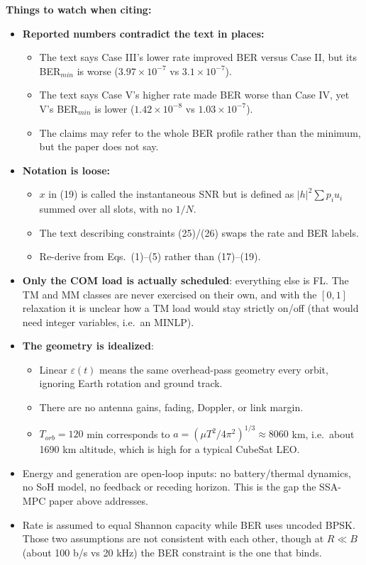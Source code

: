 \documentclass[11pt]{article}
\begin{document}
\textbf{Things to watch when citing:}
\begin{itemize}[noitemsep]
    \item \textbf{Reported numbers contradict the text in places:}
    \begin{itemize}[noitemsep]
        \item The text says Case III's lower rate improved BER versus Case II, but its BER$_{min}$ is worse ($3.97\times10^{-7}$ vs $3.1\times10^{-7}$).
        \item The text says Case V's higher rate made BER worse than Case IV, yet V's BER$_{min}$ is lower ($1.42\times10^{-8}$ vs $1.03\times10^{-7}$).
        \item The claims may refer to the whole BER profile rather than the minimum, but the paper does not say.
    \end{itemize}
    \item \textbf{Notation is loose:}
    \begin{itemize}[noitemsep]
        \item $x$ in (19) is called the instantaneous SNR but is defined as $|h|^2\sum p_i u_i$ summed over all slots, with no $1/N$.
        \item The text describing constraints (25)/(26) swaps the rate and BER labels.
        \item Re-derive from Eqs.\ (1)--(5) rather than (17)--(19).
    \end{itemize}
    \item \textbf{Only the COM load is actually scheduled}: everything else is FL. The TM and MM classes are never exercised on their own, and with the $[0,1]$ relaxation it is unclear how a TM load would stay strictly on/off (that would need integer variables, i.e.\ an MINLP).
    \item \textbf{The geometry is idealized}:
    \begin{itemize}[noitemsep]
        \item Linear $\varepsilon(t)$ means the same overhead-pass geometry every orbit, ignoring Earth rotation and ground track.
        \item There are no antenna gains, fading, Doppler, or link margin.
        \item $T_{orb} = 120$ min corresponds to $a = (\mu T^2/4\pi^2)^{1/3} \approx 8060$ km, i.e.\ about 1690 km altitude, which is high for a typical CubeSat LEO.
    \end{itemize}
    \item Energy and generation are open-loop inputs: no battery/thermal dynamics, no SoH model, no feedback or receding horizon. This is the gap the SSA-MPC paper above addresses.
    \item Rate is assumed to equal Shannon capacity while BER uses uncoded BPSK. Those two assumptions are not consistent with each other, though at $R \ll B$ (about 100 b/s vs 20 kHz) the BER constraint is the one that binds.
\end{itemize}
\end{document}
